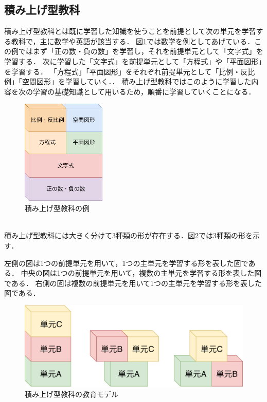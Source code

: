 \documentclass[a4j,12pt]{jsarticle}
\begin{document}
\newpage
\subsection{積み上げ型教科}
積み上げ型教科とは既に学習した知識を使うことを前提として次の単元を学習する教科で，主に数学や英語が該当する．
図\ref{fig:04}では数学を例としてあげている．この例ではまず「正の数・負の数」を学習し，それを前提単元として「文字式」を学習する．
次に学習した「文字式」を前提単元として「方程式」や「平面図形」を学習する．
「方程式」「平面図形」をそれぞれ前提単元として「比例・反比例」「空間図形」を学習していく．．
積み上げ型教科ではこのように学習した内容を次の学習の基礎知識として用いるため，順番に学習していくことになる．\\

\begin{figure}[H]
\centering
\includegraphics[width=4cm]{04.pdf}
\caption{積み上げ型教科の例}
\label{fig:04}
\end{figure} 
\ \\
積み上げ型教科には大きく分けて3種類の形が存在する．図\ref{fig:03}では3種類の形を示す．

左側の図は1つの前提単元を用いて，1つの主単元を学習する形を表した図である．
中央の図は1つの前提単元を用いて，複数の主単元を学習する形を表した図である．
右側の図は複数の前提単元を用いて1つの主単元を学習する形を表した図である．
\begin{figure}[H]
\centering
\includegraphics[width=12cm]{03.pdf}
\caption{積み上げ型教科の教育モデル}
\label{fig:03}
\end{figure} 
\end{document}
